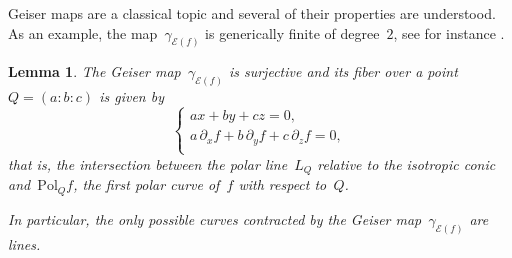 \documentclass[a4paper, 11pt, reqno]{amsart}
\theoremstyle{plain}
\newtheorem{lemma}{Lemma}[section]
\theoremstyle{definition}
\newcommand{\Eig}[1]{\mathcal{E}\!\left( {#1} \right)}
\begin{document}
Geiser maps are a classical topic and several of their properties are understood.
As an example, the map~$\gamma_{\Eig{f}}$ is generically finite of degree~$2$, see for instance \cite[Section~8.7.2]{Dolgachev}.

\begin{lemma}
The Geiser map~$\gamma_{\Eig{f}}$ is surjective and its fiber over a point $Q = (a:b:c)$ is given by
%
\begin{equation}
\label{eq:fibers}
  \left\{
  \begin{array}{l}
    a x + by + cz = 0, \\[2pt]
    a \, \partial_x f + b \, \partial_y f + c \, \partial_z f = 0,\\
  \end{array}
  \right.
\end{equation}
%
that is, the intersection between the polar line~$L_Q$ relative to the isotropic conic and~$\mathrm{Pol}_Q f$, the
first polar curve of~$f$ with respect to~$Q$.

In particular, the only possible curves contracted by the Geiser map~$\gamma_{\Eig{f}}$ are lines.
\end{lemma}
\end{document}

